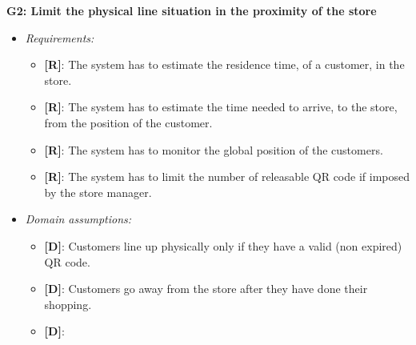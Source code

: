 \textbf{G2: Limit the physical line situation in the proximity of the store}
\begin{itemize}
\item \textit{Requirements:}
\begin{itemize}
	\item {\textbf{[R]}}: The system has to estimate the residence time, of a customer, in the store.
	\item {\textbf{[R]}}: The system has to estimate the time needed to arrive, to the store, from the position of the customer.
	\item {\textbf{[R]}}: The system has to monitor the global position of the customers.
	\item {\textbf{[R]}}: The system has to limit the number of releasable QR code if imposed by the store manager.
\end{itemize}

\item \textit{Domain assumptions:}
\begin{itemize}
	\item {\textbf{[D]}}: Customers line up physically only if they have a valid (non expired) QR code.
	\item {\textbf{[D]}}: Customers go away from the store after they have done their shopping.
	\item {\textbf{[D]}}:
\end{itemize}
\end{itemize}

